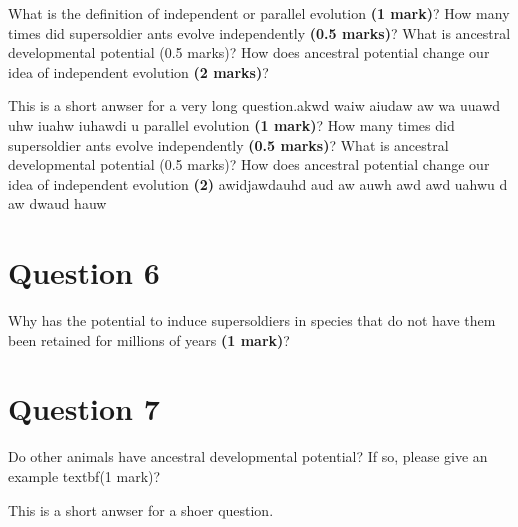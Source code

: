 \documentclass[letterpaper,12pt]{article}
\begin{document}
What is the definition of independent or parallel evolution \textbf{(1 mark)}? How many times did supersoldier ants evolve independently \textbf{(0.5 marks)}? What is ancestral developmental potential (0.5 marks)? How does ancestral potential change our idea of independent evolution \textbf{(2 marks)}?

\setlength{\parindent}{1cm} This is a short anwser for a very long question.akwd waiw aiudaw aw wa uuawd uhw  iuahw iuhawdi u parallel evolution \textbf{(1 mark)}? How many times did supersoldier ants evolve independently \textbf{(0.5 marks)}? What is ancestral developmental potential (0.5 marks)? How does ancestral potential change our idea of independent evolution \textbf{(2)} awidjawdauhd aud aw auwh 
awd awd uahwu d
aw dwaud hauw 

\section{Question 6}

Why has the potential to induce supersoldiers in species that do not have them been retained for millions of years \textbf{(1 mark)}?


\section{Question 7}

Do other animals have ancestral developmental potential? If so, please give an example textbf{(1 mark)}?

\setlength{\parindent}{1cm} This is a short anwser for a shoer question.
\end{document}
